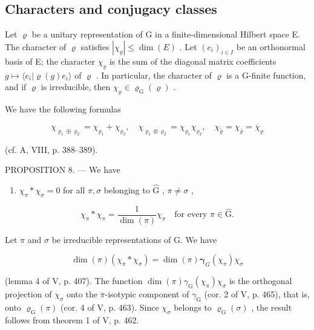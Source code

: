 \subsection{Characters and conjugacy classes}

Let \(\varrho\) be a unitary representation of G in a finite-dimensional Hilbert space E. The character of \(\varrho\) satisfies \(|\chi_{\varrho}| \leqslant \dim(E)\) . Let \((e_i)_{i \in I}\) be an orthonormal basis of E; the character \(\chi_{\varrho}\) is the sum of the diagonal matrix coefficients \(g \mapsto \langle e_i | \varrho(g)e_i \rangle\) of \(\varrho\) . In particular, the character of \(\varrho\) is a G-finite function, and if \(\varrho\) is irreducible, then \(\chi_{\varrho} \in \varrho_{\mathrm{G}}(\varrho)\) .

We have the following formulas

\[
\chi_ {\varrho_ {1} \oplus \varrho_ {2}} = \chi_ {\varrho_ {1}} + \chi_ {\varrho_ {2}}, \quad \chi_ {\varrho_ {1} \otimes \varrho_ {2}} = \chi_ {\varrho_ {1}} \chi_ {\varrho_ {2}}, \quad \chi_ {\breve {\varrho}} = \chi_ {\overline {{\varrho}}} = \overline {{\chi}} _ {\varrho}
\]

(cf. A, VIII, p. 388--389).

PROPOSITION 8. --- We have

\begin{enumerate}
\def\labelenumi{(\arabic{enumi})}
\tightlist
\item
  \(\chi_{\pi}*\chi_{\sigma} = 0\) for all \(\pi, \sigma\) belonging to \(\widehat{\mathrm{G}}\) , \(\pi \neq \sigma\) ,
\end{enumerate}

\[
\chi_ {\pi} * \chi_ {\pi} = \frac {1}{\dim (\pi)} \chi_ {\pi} \quad\text{for every }\pi\in\widehat {\mathrm{G}}.\tag{2}
\]

Let \(\pi\) and \(\sigma\) be irreducible representations of G. We have

\[
\dim (\pi) \left(\chi_ {\pi} * \chi_ {\sigma}\right) = \dim (\pi) \boldsymbol {\gamma} _ {G} \left(\chi_ {\pi}\right) \chi_ {\sigma}
\]

(lemma 4 of V, p. 407). The function \(\dim(\pi)\gamma_{\mathrm{G}}(\chi_{\pi})\chi_{\sigma}\) is the orthogonal projection of \(\chi_{\sigma}\) onto the \(\overline{\pi}\)-isotypic component of \(\gamma_{\mathrm{G}}\) (cor. 2 of V, p. 465), that is, onto \(\varrho_{\mathrm{G}}(\pi)\) (cor. 4 of V, p. 463). Since \(\chi_{\sigma}\) belongs to \(\varrho_{\mathrm{G}}(\sigma)\) , the result follows from theorem 1 of V, p. 462.

